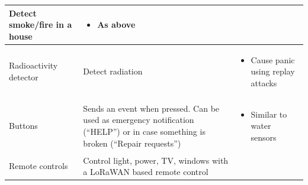 \begin{longtable}[c]{|l|l|l|}
\begin{minipage}[t]{0.30\columnwidth}
{Detect smoke/fire in a house}
\strut\end{minipage} &
\begin{minipage}[t]{0.40\columnwidth}\raggedright\strut
\begin{itemize}
\tightlist
\item
  {As above}
\end{itemize}
\strut\end{minipage}\tabularnewline
\hline
\begin{minipage}[t]{0.20\columnwidth}\raggedright\strut
{Radioactivity detector}
\strut\end{minipage} &
\begin{minipage}[t]{0.30\columnwidth}\raggedright\strut
{Detect radiation}
\strut\end{minipage} &
\begin{minipage}[t]{0.40\columnwidth}\raggedright\strut
\begin{itemize}
\tightlist
\item
  {Cause panic using replay attacks}
\end{itemize}
\strut\end{minipage}\tabularnewline
\hline
\begin{minipage}[t]{0.20\columnwidth}\raggedright\strut
{Buttons}
\strut\end{minipage} &
\begin{minipage}[t]{0.30\columnwidth}\raggedright\strut
{Sends an event when pressed. Can be used as emergency notification
(``HELP'') or in case something is broken (``Repair requests'')}
\strut\end{minipage} &
\begin{minipage}[t]{0.40\columnwidth}\raggedright\strut
\begin{itemize}
\tightlist
\item
  {Similar to water sensors}
\end{itemize}
\strut\end{minipage}\tabularnewline
\hline
\begin{minipage}[t]{0.20\columnwidth}\raggedright\strut
{Remote controls}
\strut\end{minipage} &
\begin{minipage}[t]{0.30\columnwidth}\raggedright\strut
{Control light, power, TV, windows with a LoRaWAN based remote control}
\strut\end{minipage} &
\begin{minipage}[t]{0.40\columnwidth}\raggedright\strut
\begin{itemize}
\tightlist

\end{itemize}
\end{minipage}
\end{longtable}

